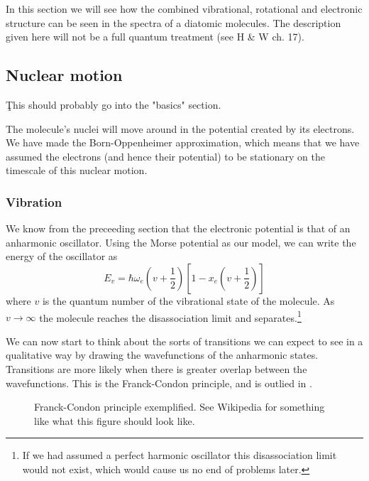 In this section we will see how the combined vibrational, rotational and
electronic structure can be seen in the spectra of a diatomic molecules. The
description given here will not be a full quantum treatment (see H \& W ch. 17).

\subsection{Nuclear motion}

\c{This should probably go into the "basics" section.}

The molecule's nuclei will move around in the potential created by its
electrons. We have made the Born-Oppenheimer approximation, which means that we
have assumed the electrons (and hence their potential) to be stationary on the
timescale of this nuclear motion.

\subsubsection{Vibration}

We know from the preceeding section that the electronic potential is that of an
anharmonic oscillator. Using the Morse potential  as our model, we
can write the energy of the oscillator as
%
\begin{equation}
  E_v = \hbar \omega_e (v + \frac{1}{2})[1 - x_e(v+\frac{1}{2})]
\end{equation}
%
 where $v$ is the quantum number of the
vibrational state of the molecule. As $v \rightarrow \infty $ the molecule
reaches the disassociation limit and separates.\footnote{If we had assumed a
perfect harmonic oscillator this disassociation limit would not exist, which
would cause us no end of problems later.} 

We can now start to think about the sorts of transitions we can expect to see in
a qualitative way by drawing the wavefunctions of the anharmonic states.
Transitions are more likely  when there is greater overlap
between the wavefunctions. This is the Franck-Condon principle, and is outlied
in .

\begin{figure}
  \caption{Franck-Condon principle exemplified. See Wikipedia for something like
  what this figure should look like.}
  \label{diaspec:fig:franckcondon}
\end{figure}

